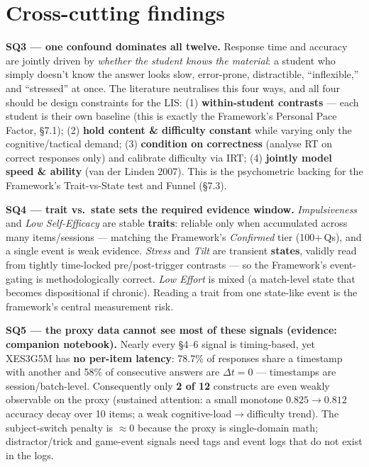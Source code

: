 \documentclass[10pt]{article}
\begin{document}
\section{Cross-cutting findings}
\textbf{SQ3 --- one confound dominates all twelve.} Response time and accuracy are jointly driven by \emph{whether the student knows the material}: a student who simply doesn't know the answer looks slow, error-prone, distractible, ``inflexible,'' and ``stressed'' at once. The literature neutralises this four ways, and all four should be design constraints for the LIS: (1) \textbf{within-student contrasts} --- each student is their own baseline (this is exactly the Framework's Personal Pace Factor, \S7.1); (2) \textbf{hold content \& difficulty constant} while varying only the cognitive/tactical demand; (3) \textbf{condition on correctness} (analyse RT on correct responses only) and calibrate difficulty via IRT; (4) \textbf{jointly model speed \& ability} (van der Linden 2007). This is the psychometric backing for the Framework's Trait-vs-State test and Funnel (\S7.3).

\textbf{SQ4 --- trait vs.\ state sets the required evidence window.} \emph{Impulsiveness} and \emph{Low Self-Efficacy} are stable \textbf{traits}: reliable only when accumulated across many items/sessions --- matching the Framework's \emph{Confirmed} tier (100+\,Qs), and a single event is weak evidence. \emph{Stress} and \emph{Tilt} are transient \textbf{states}, validly read from tightly time-locked pre/post-trigger contrasts --- so the Framework's event-gating is methodologically correct. \emph{Low Effort} is mixed (a match-level state that becomes dispositional if chronic). Reading a trait from one state-like event is the framework's central measurement risk.

\textbf{SQ5 --- the proxy data cannot see most of these signals (evidence: companion notebook).} Nearly every \S4--6 signal is timing-based, yet XES3G5M has \textbf{no per-item latency}: 78.7\% of responses share a timestamp with another and 58\% of consecutive answers are $\Delta t=0$ --- timestamps are session/batch-level. Consequently only \textbf{2 of 12} constructs are even weakly observable on the proxy (sustained attention: a small monotone $0.825\!\to\!0.812$ accuracy decay over 10 items; a weak cognitive-load$\to$difficulty trend). The subject-switch penalty is $\approx$0 because the proxy is single-domain math; distractor/trick and game-event signals need tags and event logs that do not exist in the logs.
\end{document}

